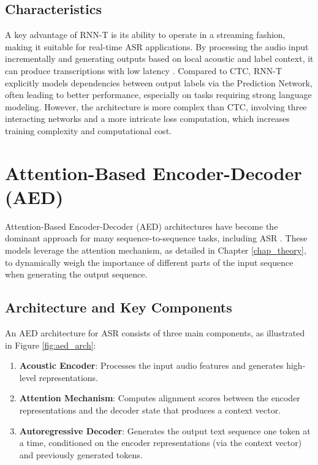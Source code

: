 \subsection{Characteristics}

A key advantage of RNN-T is its ability to operate in a streaming fashion, making it suitable for real-time ASR applications. By processing the audio input incrementally and generating outputs based on local acoustic and label context, it can produce transcriptions with low latency \cite{He_2019}. Compared to CTC, RNN-T explicitly models dependencies between output labels via the Prediction Network, often leading to better performance, especially on tasks requiring strong language modeling. However, the architecture is more complex than CTC, involving three interacting networks and a more intricate loss computation, which increases training complexity and computational cost.

\section{Attention-Based Encoder-Decoder (AED)}

Attention-Based Encoder-Decoder (AED) architectures have become the dominant approach for many sequence-to-sequence tasks, including ASR \cite{zeyer2018improved, 8462506, Dong_2019}. These models leverage the attention mechanism, as detailed in Chapter \ref{chap_theory}, to dynamically weigh the importance of different parts of the input sequence when generating the output sequence.

\subsection{Architecture and Key Components}

An AED architecture for ASR consists of three main components, as illustrated in Figure \ref{fig:aed_arch}:

\begin{enumerate}
    \item \textbf{Acoustic Encoder}: Processes the input audio features and generates high-level representations.
    \item \textbf{Attention Mechanism}: Computes alignment scores between the encoder representations and the decoder state that produces a context vector.
    \item \textbf{Autoregressive Decoder}: Generates the output text sequence one token at a time, conditioned on the encoder representations (via the context vector) and previously generated tokens.
\end{enumerate}

